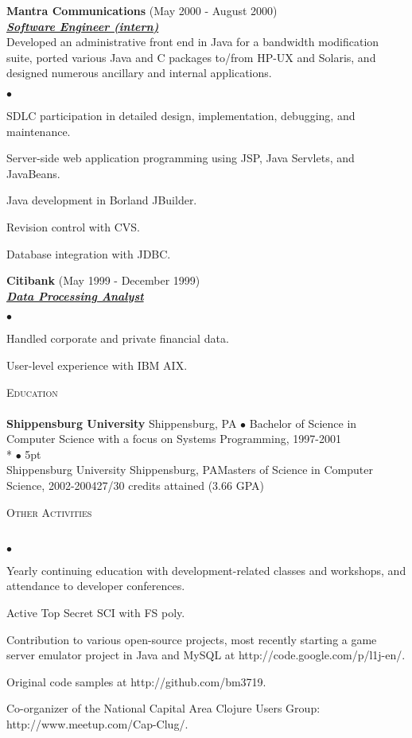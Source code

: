 \documentclass{article}
\newcommand{\lineunder}{\vspace*{-8pt} \\ \hspace*{-18pt} \hrulefill \\}
\newcommand{\header}[1]{{\hspace*{-15pt}\vspace*{7pt} \textsc{#1}} \vspace*{-7pt} \lineunder}
\newcommand{\employer}[3]{{ \textbf{#1} (#2)\\ \underline{\textbf{\emph{#3}}}\\  }}
\newenvironment{achievements}{\begin{list}{$\bullet$}{\topsep 0pt \itemsep
      -2pt}}{\vspace*{4pt}\end{list}}
\newcommand{\schoolwithcourses}[4]{
\textbf{#1} #2 $\bullet$ #3\\
#4
\vspace*{5pt}
}
\begin{document}
\employer{Mantra Communications}{May 2000 - August 2000}{Software Engineer
  (intern)} Developed an administrative front end in Java for a bandwidth
modification suite, ported various Java and C packages to/from HP-UX and
Solaris, and designed numerous ancillary and internal applications.
\begin{achievements}
\item SDLC participation in detailed design, implementation, debugging, and
  maintenance.
\item Server-side web application programming using JSP, Java Servlets, and
  JavaBeans.
\item Java development in Borland JBuilder.
\item Revision control with CVS.
\item Database integration with JDBC.
\end{achievements}

\employer{Citibank}{May 1999 - December 1999}{Data Processing Analyst}
\begin{achievements}
\item Handled corporate and private financial data.
\item User-level experience with IBM AIX.
\end{achievements}

\header{Education}

\schoolwithcourses{Shippensburg University}{Shippensburg, PA}{Bachelor of
  Science in Computer Science with a focus on Systems Programming, 1997-2001}

\schoolwithcourses{Shippensburg University}{Shippensburg, PA}{Masters of
  Science in Computer Science, 2002-2004}{27/30 credits attained (3.66 GPA)}

\header{Other Activities}
\begin{achievements}
\item Yearly continuing education with development-related classes and
  workshops, and attendance to developer conferences.
\item Active Top Secret SCI with FS poly.
\item Contribution to various open-source projects, most recently starting a
  game server emulator project in Java and MySQL at
  http://code.google.com/p/l1j-en/.
\item Original code samples at http://github.com/bm3719.
\item Co-organizer of the National Capital Area Clojure Users Group:
  http://www.meetup.com/Cap-Clug/.
\end{achievements}
\end{document}
